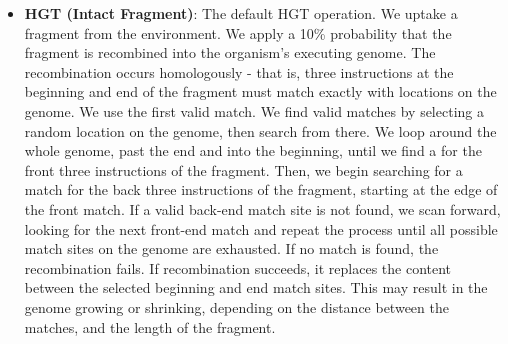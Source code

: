 \documentclass[PhD]{msu-thesis}
\begin{document}
\begin{itemize}
	\item \textbf{HGT (Intact Fragment)}: The default HGT operation. We uptake a fragment from the environment. We apply a 10\% probability that the fragment is recombined into the organism's executing genome.
The recombination occurs homologously - that is, three instructions at the beginning and end of the fragment must match exactly with locations on the genome. We use the first valid match. We find valid matches by selecting a random location on the genome, then search from there. We loop around the whole genome, past the end and into the beginning, until we find a for the front three instructions of the fragment. Then, we begin searching for a match for the back three instructions of the fragment, starting at the edge of the front match. If a valid back-end match site is not found, we scan forward, looking for the next front-end match and repeat the process until all possible match sites on the genome are exhausted.
If no match is found, the recombination fails. If recombination succeeds, it replaces the content between the selected beginning and end match sites. This may result in the genome growing or shrinking, depending on the distance between the matches, and the length of the fragment.
	

\end{itemize}
\end{document}
